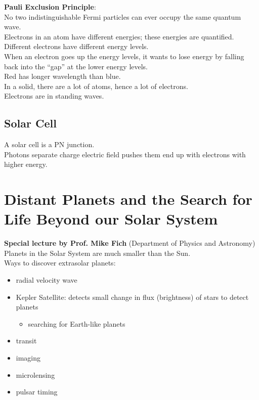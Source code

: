 \documentclass[12pt]{article}
\theoremstyle{definition}
\begin{document}
\textbf{Pauli Exclusion Principle}: \\
No two indistinguishable Fermi particles can ever occupy the same quantum wave. \\

Electrons in an atom have different energies;
these energies are quantified. \\
Different electrons have different energy levels. \\
When an electron goes up the energy levels, it wants to lose energy by falling back into the ``gap'' at the lower energy levels. \\

Red has longer wavelength than blue. \\

In a solid, there are a lot of atoms, hence a lot of electrons. \\
Electrons are in standing waves.

\subsection{Solar Cell}
A solar cell is a PN junction. \\
Photons separate charge electric field pushes them end up with electrons with higher energy.


\newpage
\section{Distant Planets and the Search for Life Beyond our Solar System}
\textbf{Special lecture by Prof. Mike Fich} (Department of Physics and Astronomy) \\

Planets in the Solar System are much smaller than the Sun. \\

Ways to discover extrasolar planets:
\begin{itemize}
  \item radial velocity wave
  \item Kepler Satellite: detects small change in flux (brightness) of stars to detect planets
  \begin{itemize}
    \item searching for Earth-like planets
  \end{itemize}
  \item transit
  \item imaging
  \item microlensing
  \item pulsar timing
\end{itemize}
\end{document}
